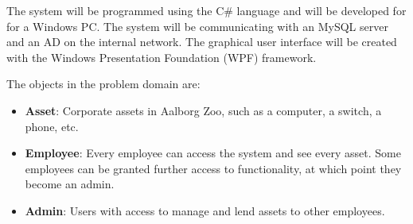 \par
The system will be programmed using the C\# language and will be developed for for a Windows PC. The system will be communicating with an MySQL server and an AD on the internal network. The graphical user interface will be created with the Windows Presentation Foundation (WPF) framework.
\par
The objects in the problem domain are: 
\begin{itemize}
    \item \textbf{Asset}: Corporate assets in Aalborg Zoo, such as a computer, a switch, a phone, etc.

    
    \item \textbf{Employee}: Every employee can access the system and see every asset. Some employees can be granted further access to functionality, at which point they become an admin.
    
    \item \textbf{Admin}: Users with access to manage and lend assets to other employees.
\end{itemize}

